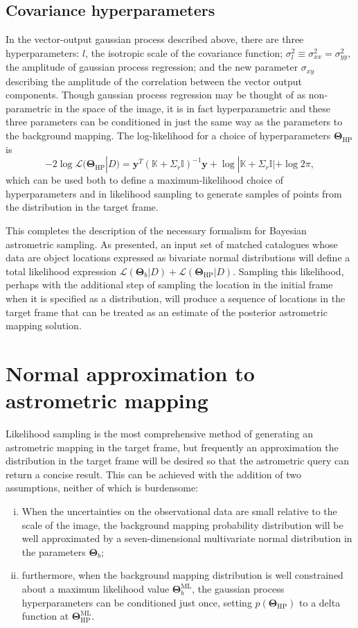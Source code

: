 \documentclass[manuscript]{aastex}
\newcommand{\bsT}{\boldsymbol\Theta}
\begin{document}
\subsection{Covariance hyperparameters}
In the vector-output gaussian process described above, there are three hyperparameters: $l$, the isotropic scale of the covariance function; $\sigma^2_{l}\equiv \sigma^2_{xx}=\sigma^2_{yy}$, the amplitude of gaussian process regression; and the new parameter $\sigma_{xy}$ describing the amplitude of the correlation between the vector output components. Though gaussian process regression may be thought of as non-parametric in the space of the image, it is in fact hyperparametric and these three parameters can be conditioned in just the same way as the parameters to the background mapping. The log-likelihood for a choice of hyperparameters $\bsT_\mathrm{HP}$ is
\begin{equation}
-2\log\mathcal{L}(\bsT_\mathrm{HP}|D) = \mathbf{y}^T(\mathbb{K}+\Sigma_r\mathbb{I})^{-1} \mathbf{y} + \log|\mathbb{K}+\Sigma_r\mathbb{I}| + \log2\pi,
\end{equation}
which can be used both to define a maximum-likelihood choice of hyperparameters and in likelihood sampling to generate samples of points from the distribution in the target frame.

This completes the description of the necessary formalism for Bayesian astrometric sampling. As presented, an input set of matched catalogues whose data are object locations expressed as bivariate normal distributions will define a total likelihood expression $\mathcal{L}(\bsT_b|D) + \mathcal{L}(\bsT_\mathrm{HP}|D)$. Sampling this likelihood, perhaps with the additional step of sampling the location in the initial frame when it is specified as a distribution, will produce a sequence of locations in the target frame that can be treated as an estimate of the posterior astrometric mapping solution.

\section{Normal approximation to astrometric mapping}\label{sec:normapprox}
Likelihood sampling is the most comprehensive method of generating an astrometric mapping in the target frame, but frequently an approximation the distribution in the target frame will be desired so that the astrometric query can return a concise result. This can be achieved with the addition of two assumptions, neither of which is burdensome:
\begin{enumerate}[(i)]
\item When the uncertainties on the observational data are small relative to the scale of the image, the background mapping probability distribution will be well approximated by a seven-dimensional multivariate normal distribution in the parameters $\bsT_b$;
\item furthermore, when the background mapping distribution is well constrained about a maximum likelihood value $\bsT_b^\mathrm{ML}$, the gaussian process hyperparameters can be conditioned just once, setting $p(\bsT_\mathrm{HP})$ to a delta function at $\bsT_\mathrm{HP}^\mathrm{ML}$.
\end{enumerate}
\end{document}
